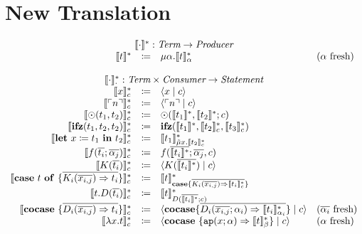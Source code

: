 \documentclass[nonacm]{acmart}
\newcommand{\translate}[1]{\ensuremath{\llbracket#1 \rrbracket}}
\newcommand{\lit}[1]{\ensuremath{\ulcorner #1\urcorner}}
\newcommand{\cut}[2]{\ensuremath{\langle #1 \mid #2 \rangle}}
\newcommand{\letin}[3]{\ensuremath{\mathbf{let}\ #1 \coloneqq #2\ \mathbf{in}\ #3}}
\newcommand{\caseof}[2]{\ensuremath{\mathbf{case}\ #1\ \mathbf{of}\ \{ #2 \}}}
\newcommand{\translatestar}[2]{\ensuremath{\llbracket #1 \rrbracket_{#2}^*}}
\newcommand{\fresh}[1]{\ensuremath{(#1\text{ fresh})}}
\begin{document}
\section{New Translation}
\label{sec:new-translation}

\[
  \begin{array}{rcll}
    \multicolumn{4}{c}{\translate{\cdot}^* : \emph{Term} \rightarrow  \emph{Producer}}\\
    \translate{t}^* & \coloneqq & \mu \alpha. \translatestar{t}{\alpha} & \fresh{\alpha}\\
    \\
    \multicolumn{4}{c}{\translatestar{\cdot}{\cdot} : \emph{Term}\times \emph{Consumer} \rightarrow \emph{Statement}}\\
    \translatestar{x}{c} & \coloneq & \cut{x}{c} & \\
    \translatestar{\lit{n}}{c} & \coloneq & \cut{\lit{n}}{c} & \\
    \translatestar{\odot(t_1,t_2)}{c} & \coloneq & \odot(\translate{t_1}^*,\translate{t_2}^*;c) & \\
    \translatestar{\mathbf{ifz}(t_1,t_2,t_2)}{c} & \coloneq & \mathbf{ifz}(\translate{t_1}^*,\translatestar{t_2}{c},\translatestar{t_3}{c}) & \\
    \translatestar{\letin{x}{t_1}{t_2}}{c} & \coloneq & \translatestar{t_1}{\tilde{\mu}x.\translatestar{t_2}{c}} & \\
    \translatestar{f(\overline{t_i};\overline{\alpha_j})}{c} & \coloneq & f(\overline{\translate{t_i}^*};\overline{\alpha_j},c) & \\
    \translatestar{K(\overline{t_i})}{c} & \coloneq & \cut{K(\overline{\translate{t_i}^*})}{c} & \\
    \translatestar{\caseof{t}{\overline{K_i(\overline{x_{i,j}})\Rightarrow t_i}}}{c} & \coloneq & \translatestar{t}{\mathbf{case}\{ \overline{K_i(\overline{x_{i,j}})\Rightarrow \translatestar{t_i}{c}}\}} & \\
    \translatestar{t.D(\overline{t_i})}{c} & \coloneq & \translatestar{t}{D(\overline{\translate{t_i}^*};c)} & \\
    \translatestar{\mathbf{cocase}\ \{\overline{D_i(\overline{x_{i,j}}) \Rightarrow t_i}\}}{c} & \coloneq & \cut{\mathbf{cocase}\{\overline{D_i(\overline{x_{i,j}};\alpha_i)\Rightarrow \translatestar{t_i}{\alpha_i}}\}}{c} & \fresh{\overline{\alpha_i}} \\
    \translatestar{\lambda x.t}{c} & \coloneq & \cut{\mathbf{cocase}\ \{ \mathtt{ap}(x;\alpha) \Rightarrow \translatestar{t}{\beta} \}}{c} & \fresh{\alpha} \\

\end{array}\]
\end{document}
